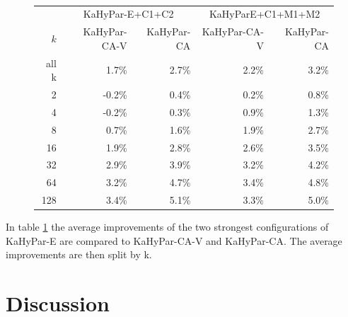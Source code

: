 \documentclass[a4paper,12pt,titlepage, BCOR7mm,headsepline]{scrbook}
\numberwithin{equation}{section}
\begin{document}
\begin{figure}[t]


\centering
\vspace{0pt}
~\label{tbl:imp}
\begin{tabular}[H]{r||r|r||r|r}\label{tab:improvement}
&\multicolumn{2}{c||}{KaHyPar-E+C1+C2} & \multicolumn{2}{c}{KaHyParE+C1+M1+M2} \\
$k$                     &                              KaHyPar-CA-V    & KaHyPar-CA &  KaHyPar-CA-V   & KaHyPar-CA  \\ 
                     \hline
                     \hline

all k &  1.7\% & 2.7\% & 2.2\% & 3.2\% \\
\hline
2&-0.2\% & 0.4\% & 0.2\% & 0.8\% \\
4& -0.2\% &0.3\% &0.9\% &1.3\%\\
8& 0.7\% &1.6\%& 1.9\% &2.7\%\\
16& 1.9\% &2.8\%& 2.6\%& 3.5\%\\
32& 2.9\% &3.9\%& 3.2\%& 4.2\%\\
64&  3.2\% &4.7\%& 3.4\% &4.8\%\\
128& 3.4\% &5.1\%& 3.3\% &5.0\% \\ 
\end{tabular}

\end{figure}
In table  \ref{tab:improvement} the average improvements of the two strongest configurations of KaHyPar-E are compared to KaHyPar-CA-V and KaHyPar-CA. 
The average improvements are then split by k. 







\chapter{Discussion}
\end{document}
